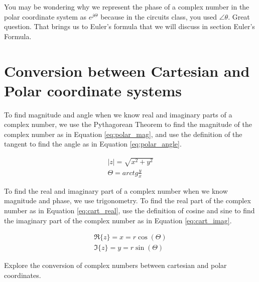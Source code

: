 \documentclass{ximera}
\begin{document}
You may be wondering why we represent the phase of a complex number in the polar coordinate system as  $e^{j \Theta}$ because in the circuits class, you used $ \angle \theta $. Great question. That brings us to Euler's formula that we will discuss in section Euler's Formula.

\section{Conversion between Cartesian and Polar coordinate systems}
  
  To find magnitude and angle when we know real and imaginary parts of a complex number, we use the Pythagorean Theorem to find the magnitude of the complex number as in Equation \ref{eq:polar_mag}, and use the definition of the tangent to find the angle as in Equation \ref{eq:polar_angle}.

\begin{eqnarray}
|z|=\sqrt{x^2+y^2} \label{eq:polar_mag}\\
\Theta = arctg \frac{y}{x} \label{eq:polar_angle}
\end{eqnarray}
 
 
 To find the real and imaginary part of a complex number when we know magnitude and phase, we use trigonometry. To find the real part of the complex number as in Equation \ref{eq:cart_real}, use the definition of cosine and sine to find the imaginary part of the complex number as in Equation \ref{eq:cart_imag}.


\begin{eqnarray}
\Re \{z\} =x= r \cos (\Theta) \label{eq:cart_real}\\
\Im \{z\} =y= r \sin (\Theta)  \label{eq:cart_imag}
\end{eqnarray}


\begin{question}
Explore the conversion of complex numbers between cartesian and polar coordinates.
\begin{center}  
\end{center} 
\end{question}
\end{document}
